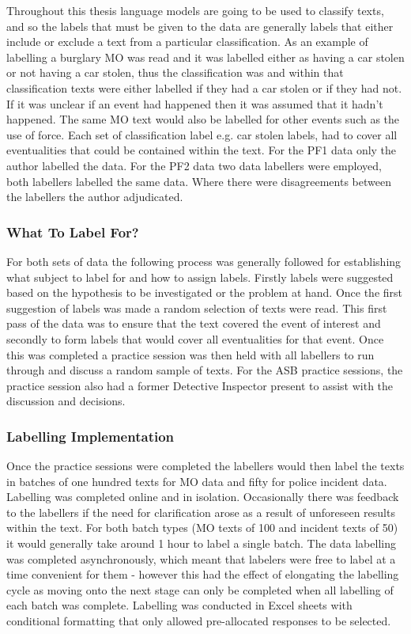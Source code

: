 Throughout this thesis language models are going to be used to classify texts, and so the labels that must be given to the data are generally labels that either include or exclude a text from a particular classification. As an example of labelling a burglary MO was read and it was labelled either as having a car stolen or not having a car stolen, thus the classification was  and within that classification texts were either labelled  if they had a car stolen or  if they had not. If it was unclear if an event had happened then it was assumed that it hadn't happened.  The same MO text would also be labelled for other events such as the use of force. Each set of classification label e.g. car stolen labels, had to cover all eventualities that could be contained within the text. For the PF1 data only the author labelled the data. For the PF2 data two data labellers were employed, both labellers labelled the same data. Where there were disagreements between the labellers the author adjudicated.

\subsubsection{What To Label For?}

For both sets of data the following process was generally followed for establishing what subject to label for and how to assign labels. Firstly labels were suggested based on the hypothesis to be investigated or the problem at hand. Once the first suggestion of labels was made a random selection of texts were read. This first pass of the data was to ensure that the text covered the event of interest and secondly to form labels that would cover all eventualities for that event. Once this was completed a practice session was then held with all labellers to run through and discuss a random sample of texts. For the ASB practice sessions, the practice session also had a former Detective Inspector present to assist with the discussion and decisions.

\subsubsection{Labelling Implementation}

Once the practice sessions were completed the labellers would then label the texts in batches of one hundred texts for MO data and fifty for police incident data. Labelling was completed online and in isolation. Occasionally there was feedback to the labellers if the need for clarification arose as a result of unforeseen results within the text. For both batch types (MO texts of 100 and incident texts of 50) it would generally take around 1 hour to label a single batch. The data labelling was completed asynchronously, which meant that labelers were free to label at a time convenient for them - however this had the effect of elongating the labelling cycle as moving onto the next stage can only be completed when all labelling of each batch was complete. Labelling was conducted in Excel sheets with conditional formatting that only allowed pre-allocated responses to be selected.

